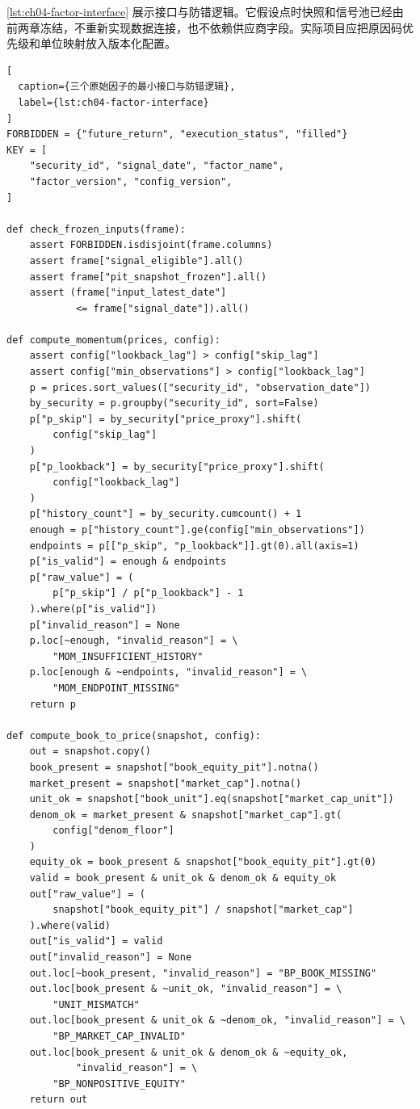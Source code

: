 \cref{lst:ch04-factor-interface} 展示接口与防错逻辑。它假设点时快照和信号池已经由前两章冻结，不重新实现数据连接，也不依赖供应商字段。实际项目应把原因码优先级和单位映射放入版本化配置。

\begin{lstlisting}[
  caption={三个原始因子的最小接口与防错逻辑},
  label={lst:ch04-factor-interface}
]
FORBIDDEN = {"future_return", "execution_status", "filled"}
KEY = [
    "security_id", "signal_date", "factor_name",
    "factor_version", "config_version",
]

def check_frozen_inputs(frame):
    assert FORBIDDEN.isdisjoint(frame.columns)
    assert frame["signal_eligible"].all()
    assert frame["pit_snapshot_frozen"].all()
    assert (frame["input_latest_date"]
            <= frame["signal_date"]).all()

def compute_momentum(prices, config):
    assert config["lookback_lag"] > config["skip_lag"]
    assert config["min_observations"] > config["lookback_lag"]
    p = prices.sort_values(["security_id", "observation_date"])
    by_security = p.groupby("security_id", sort=False)
    p["p_skip"] = by_security["price_proxy"].shift(
        config["skip_lag"]
    )
    p["p_lookback"] = by_security["price_proxy"].shift(
        config["lookback_lag"]
    )
    p["history_count"] = by_security.cumcount() + 1
    enough = p["history_count"].ge(config["min_observations"])
    endpoints = p[["p_skip", "p_lookback"]].gt(0).all(axis=1)
    p["is_valid"] = enough & endpoints
    p["raw_value"] = (
        p["p_skip"] / p["p_lookback"] - 1
    ).where(p["is_valid"])
    p["invalid_reason"] = None
    p.loc[~enough, "invalid_reason"] = \
        "MOM_INSUFFICIENT_HISTORY"
    p.loc[enough & ~endpoints, "invalid_reason"] = \
        "MOM_ENDPOINT_MISSING"
    return p

def compute_book_to_price(snapshot, config):
    out = snapshot.copy()
    book_present = snapshot["book_equity_pit"].notna()
    market_present = snapshot["market_cap"].notna()
    unit_ok = snapshot["book_unit"].eq(snapshot["market_cap_unit"])
    denom_ok = market_present & snapshot["market_cap"].gt(
        config["denom_floor"]
    )
    equity_ok = book_present & snapshot["book_equity_pit"].gt(0)
    valid = book_present & unit_ok & denom_ok & equity_ok
    out["raw_value"] = (
        snapshot["book_equity_pit"] / snapshot["market_cap"]
    ).where(valid)
    out["is_valid"] = valid
    out["invalid_reason"] = None
    out.loc[~book_present, "invalid_reason"] = "BP_BOOK_MISSING"
    out.loc[book_present & ~unit_ok, "invalid_reason"] = \
        "UNIT_MISMATCH"
    out.loc[book_present & unit_ok & ~denom_ok, "invalid_reason"] = \
        "BP_MARKET_CAP_INVALID"
    out.loc[book_present & unit_ok & denom_ok & ~equity_ok,
            "invalid_reason"] = \
        "BP_NONPOSITIVE_EQUITY"
    return out


\end{lstlisting}
